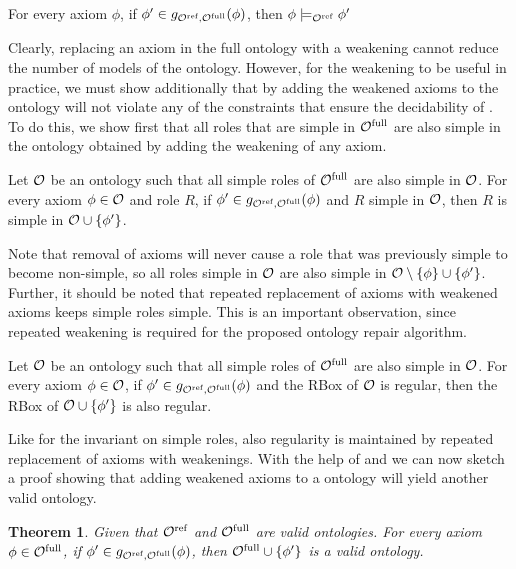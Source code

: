 \documentclass[
]{ceurart}
\newtheorem{theorem}{Theorem}
\begin{document}
\begin{lemma} \label{lem:weaker}
  For every \SROIQ axiom $\phi$, if $\phi' \in g_{{\mathcal{O}^\textnormal{ref}},{\mathcal{O}^\textnormal{full}}}(\phi)$, then $\phi \models_{\mathcal{O}^\textnormal{ref}} \phi'$
\end{lemma}

Clearly, replacing an axiom in the full ontology with a weakening cannot reduce the number of models of the ontology. However, for the weakening to be useful in practice, we must show additionally that by adding the weakened axioms to the ontology will not violate any of the constraints that ensure the decidability of \SROIQ. To do this, we show first that all roles that are simple in ${\mathcal{O}^\textnormal{full}}$ are also simple in the ontology obtained by adding the weakening of any axiom.

\begin{lemma} \label{lem:simple-roles}
  Let $\mathcal{O}$ be an ontology such that all simple roles of ${\mathcal{O}^\textnormal{full}}$ are also simple in $\mathcal{O}$. For every axiom $\phi \in \mathcal{O}$ and role $R$, if $\phi' \in g_{{\mathcal{O}^\textnormal{ref}},{\mathcal{O}^\textnormal{full}}}(\phi)$ and $R$ simple in $\mathcal{O}$, then $R$ is simple in $\mathcal{O} \cup \{ \phi' \}$.
\end{lemma}

Note that removal of axioms will never cause a role that was previously simple to become non-simple, so all roles simple in $\mathcal{O}$ are also simple in $\mathcal{O} \setminus \{ \phi \} \cup\{ \phi' \}$. Further, it should be noted that repeated replacement of axioms with weakened axioms keeps simple roles simple. This is an important observation, since repeated weakening is required for the proposed ontology repair algorithm.

\begin{lemma} \label{lem:regularity}
  Let $\mathcal{O}$ be an ontology such that all simple roles of ${\mathcal{O}^\textnormal{full}}$ are also simple in $\mathcal{O}$. For every axiom $\phi \in \mathcal{O}$, if $\phi' \in g_{{\mathcal{O}^\textnormal{ref}},{\mathcal{O}^\textnormal{full}}}(\phi)$ and the RBox of $\mathcal{O}$ is regular, then the RBox of $\mathcal{O} \cup \{ \phi' \}$ is also regular.
\end{lemma}

Like for the invariant on simple roles, also regularity is maintained by repeated replacement of axioms with weakenings. With the help of  and  we can now sketch a proof showing that adding weakened axioms to a \SROIQ ontology will yield another valid \SROIQ ontology.

\begin{theorem} \label{lem:global-constraints}
  Given that ${\mathcal{O}^\textnormal{ref}}$ and ${\mathcal{O}^\textnormal{full}}$ are valid \SROIQ ontologies. For every axiom $\phi \in {\mathcal{O}^\textnormal{full}}$, if $\phi' \in g_{{\mathcal{O}^\textnormal{ref}},{\mathcal{O}^\textnormal{full}}}(\phi)$, then ${\mathcal{O}^\textnormal{full}} \cup \{ \phi' \}$ is a valid \SROIQ ontology.
\end{theorem}
\end{document}
